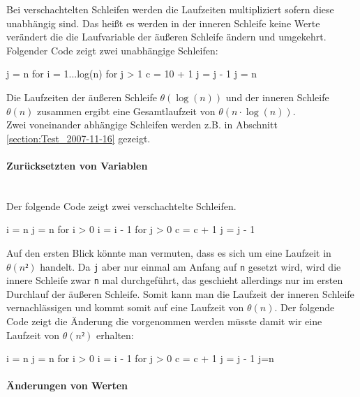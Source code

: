 \documentclass[a4paper, 12pt]{article}
\begin{document}
Bei verschachtelten Schleifen werden die Laufzeiten multipliziert sofern diese unabhängig sind. Das heißt es werden in der inneren Schleife keine Werte verändert die die Laufvariable der äußeren Schleife ändern und \break umgekehrt. Folgender Code zeigt zwei unabhängige Schleifen:

\begin{verbatimtab}
j = n
for i = 1...log(n) {
	for j > 1 {
		c = 10 + 1
		j = j - 1
	}
	j = n
}
\end{verbatimtab}

Die Laufzeiten der äußeren Schleife $θ\left(\log\left(n\right)\right)$ und der inneren Schleife $θ\left(n\right)$ zusammen ergibt eine Gesamtlaufzeit von $θ\left( n⋅\log\left(n\right) \right)$.\\

Zwei voneinander abhängige Schleifen werden z.B. in Abschnitt \ref{section:Test_2007-11-16} gezeigt.

\paragraph{Zurücksetzten von Variablen}~\\

Der folgende Code zeigt zwei verschachtelte Schleifen. 

\begin{verbatimtab}
i = n
j = n
for i > 0 {
	i = i - 1
	for j > 0 {
		c = c + 1
		j = j - 1
	}
}
\end{verbatimtab}

Auf den ersten Blick könnte man vermuten, dass es sich um eine Laufzeit in $θ\left(n²\right)$ handelt. Da \texttt{j} aber nur einmal am Anfang auf \texttt{n} gesetzt wird, wird die innere Schleife zwar \texttt{n} mal durchgeführt, das geschieht allerdings nur im ersten Durchlauf der äußeren Schleife. Somit kann man die Laufzeit der inneren Schleife vernachlässigen und kommt somit auf eine Laufzeit von $θ\left(n\right)$. Der folgende Code zeigt die Änderung die vorgenommen werden müsste damit wir eine Laufzeit von $θ\left(n²\right)$ erhalten:

\begin{verbatimtab}
i = n
j = n
for i > 0 {
	i = i - 1
	for j > 0 {
		c = c + 1
		j = j - 1
	}
	j=n
}
\end{verbatimtab}

\paragraph{Änderungen von Werten}~\\
\end{document}
